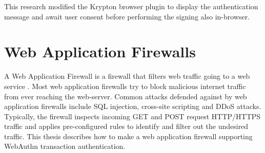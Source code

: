 This research modified the Krypton browser plugin to display the authentication message and await user consent before performing the signing also in-browser.


\section{Web Application Firewalls}

A Web Application Firewall is a firewall that filters web traffic going to a web service \cite{web-application-firewall}. Most web application firewalls try to block malicious internet traffic from ever reaching the web-server. Common attacks defended against by web application firewalls include SQL injection, cross-site scripting and DDoS attacks. Typically, the firewall inspects incoming GET and POST request HTTP/HTTPS traffic and applies pre-configured rules to identify and filter out the undesired traffic. This thesis describes how to make a web application firewall supporting WebAuthn transaction authentication.






